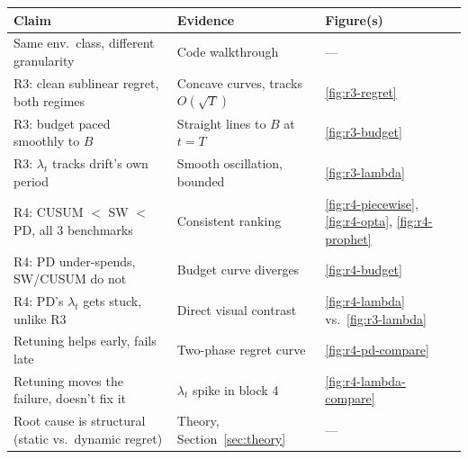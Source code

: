 \documentclass[11pt,a4paper]{article}
\newcommand{\1}{\mathbf{1}}
\begin{document}
\begin{center}
\begin{tabular}{@{}lll@{}}
\toprule
Claim & Evidence & Figure(s) \\
\midrule
Same env.\ class, different granularity & Code walkthrough & --- \\
R3: clean sublinear regret, both regimes & Concave curves, tracks $O(\sqrt T)$ & \ref{fig:r3-regret} \\
R3: budget paced smoothly to $B$ & Straight lines to $B$ at $t=T$ & \ref{fig:r3-budget} \\
R3: $\lambda_t$ tracks drift's own period & Smooth oscillation, bounded & \ref{fig:r3-lambda} \\
R4: CUSUM $<$ SW $<$ PD, all 3 benchmarks & Consistent ranking & \ref{fig:r4-piecewise}, \ref{fig:r4-opta}, \ref{fig:r4-prophet} \\
R4: PD under-spends, SW/CUSUM do not & Budget curve diverges & \ref{fig:r4-budget} \\
R4: PD's $\lambda_t$ gets stuck, unlike R3 & Direct visual contrast & \ref{fig:r4-lambda} vs.\ \ref{fig:r3-lambda} \\
Retuning helps early, fails late & Two-phase regret curve & \ref{fig:r4-pd-compare} \\
Retuning moves the failure, doesn't fix it & $\lambda_t$ spike in block 4 & \ref{fig:r4-lambda-compare} \\
Root cause is structural (static vs.\ dynamic regret) & Theory, Section~\ref{sec:theory} & --- \\
\bottomrule
\end{tabular}
\end{center}
\end{document}
